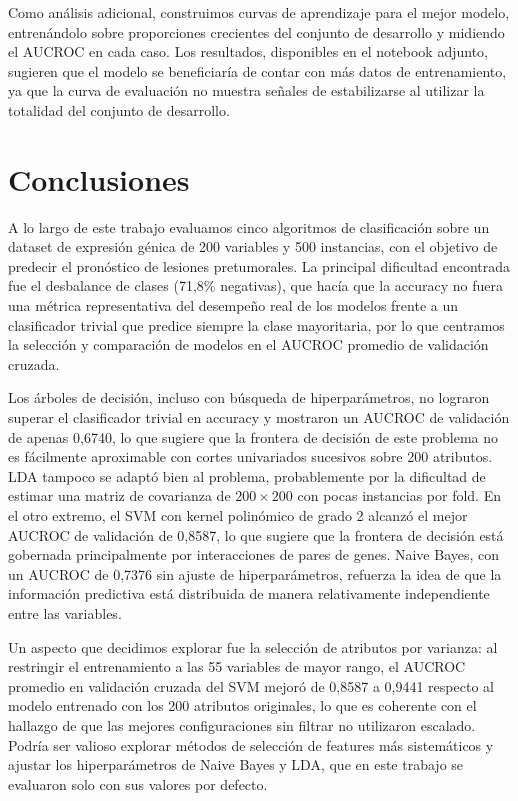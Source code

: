 \documentclass[10pt,a4paper]{article}
\begin{document}
Como análisis adicional, construimos curvas de aprendizaje para el mejor modelo, entrenándolo sobre proporciones crecientes del conjunto de desarrollo y midiendo el AUCROC en cada caso. Los resultados, disponibles en el notebook adjunto, sugieren que el modelo se beneficiaría de contar con más datos de entrenamiento, ya que la curva de evaluación no muestra señales de estabilizarse al utilizar la totalidad del conjunto de desarrollo.

\section{Conclusiones}
A lo largo de este trabajo evaluamos cinco algoritmos de clasificación sobre un dataset de expresión génica de 200 variables y 500 instancias, con el objetivo de predecir el pronóstico de lesiones pretumorales. La principal dificultad encontrada fue el desbalance de clases (71,8\% negativas), que hacía que la accuracy no fuera una métrica representativa del desempeño real de los modelos frente a un clasificador trivial que predice siempre la clase mayoritaria, por lo que centramos la selección y comparación de modelos en el AUCROC promedio de validación cruzada.

Los árboles de decisión, incluso con búsqueda de hiperparámetros, no lograron superar el clasificador trivial en accuracy y mostraron un AUCROC de validación de apenas 0,6740, lo que sugiere que la frontera de decisión de este problema no es fácilmente aproximable con cortes univariados sucesivos sobre 200 atributos. LDA tampoco se adaptó bien al problema, probablemente por la dificultad de estimar una matriz de covarianza de $200\times200$ con pocas instancias por fold. En el otro extremo, el SVM con kernel polinómico de grado 2 alcanzó el mejor AUCROC de validación de 0,8587, lo que sugiere que la frontera de decisión está gobernada principalmente por interacciones de pares de genes. Naive Bayes, con un AUCROC de 0,7376 sin ajuste de hiperparámetros, refuerza la idea de que la información predictiva está distribuida de manera relativamente independiente entre las variables.

Un aspecto que decidimos explorar fue la selección de atributos por varianza: al restringir el entrenamiento a las 55 variables de mayor rango, el AUCROC promedio en validación cruzada del SVM mejoró de 0,8587 a 0,9441 respecto al modelo entrenado con los 200 atributos originales, lo que es coherente con el hallazgo de que las mejores configuraciones sin filtrar no utilizaron escalado. Podría ser valioso explorar métodos de selección de features más sistemáticos y ajustar los hiperparámetros de Naive Bayes y LDA, que en este trabajo se evaluaron solo con sus valores por defecto.
\end{document}
